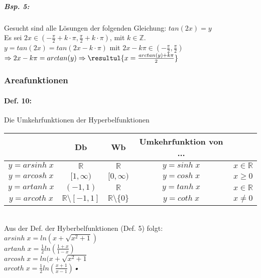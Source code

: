 \subparagraph{Bsp. 5:}\parskp
Gesucht sind alle Lösungen der folgenden Gleichung: $tan(2x)=y$\\
Es sei $2x \in \left( -\frac{\pi}{2}+k \cdot \pi, \frac{\pi}{2} + k \cdot \pi\right)$, mit $k \in \mathbb{Z}$.\\
$y=tan(2x)=tan(2x-k\cdot \pi)$ mit $2x-k\pi \in \left(-\frac{\pi}{2}, \frac{\pi}{2}\right)$\\
$\Rightarrow 2x - k \pi = arctan(y) \Rightarrow \resultul{x = \frac{arctan(y)+k\pi}{2}}$

\subsubsection{Areafunktionen}

\paragraph{Def. 10:} \parskp
Die Umkehrfunktionen der Hyperbelfunktionen\\
\begin{tabular}{c | c | c | c l}
 & Db & Wb & Umkehrfunktion von ...\\
\hline
$y=arsinh\; x$ & $\mathbb{R}$ & $\mathbb{R}$ & $y=sinh\;x$ & $ x \in \mathbb{R}$\\
$y=arcosh\; x $ & $[1,\infty)$ & $[0,\infty)$ & $y=cosh\; x$ & $x\geq 0$\\
$y=artanh\; x$ & $(-1,1)$ & $\mathbb{R}$ & $y=tanh \; x $ & $x \in \mathbb{R}$\\
$y=arcoth\; x $ & $\mathbb{R}\setminus[-1,1]$ & $\mathbb{R}\setminus\{0\}$ & $y=coth\; x$ & $x \not = 0$\\
\end{tabular}\\
Aus der Def. der Hyberbelfunktionen (Def. 5) folgt:\\
$arsinh\; x = ln (x+\sqrt{x^2+1})$\\
$artanh\; x=\frac{1}{2}ln\left(\frac{1+x}{1-x}\right)$\\
$arcosh\; x = ln (x+\sqrt{x^2+1}$\\
$arcoth\; x = \frac{1}{2}ln\left(\frac{x+1}{x-1}\right)$\textsl{•}